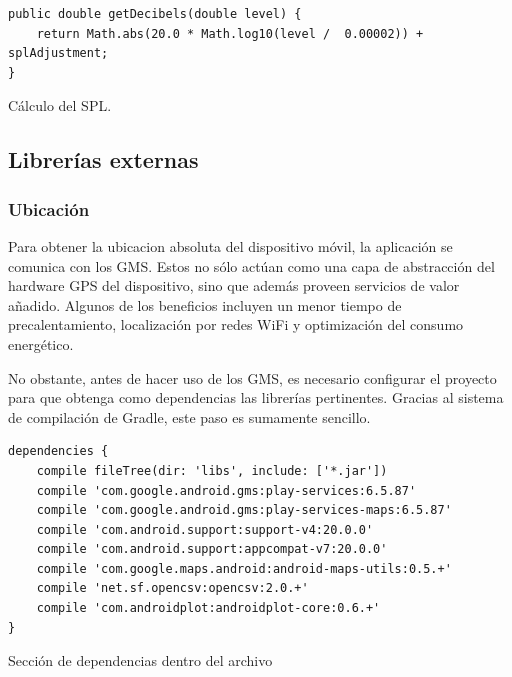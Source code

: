 \begin{listing}[h] 
\begin{verbatim}
public double getDecibels(double level) {
    return Math.abs(20.0 * Math.log10(level /  0.00002)) + splAdjustment;
}
\end{verbatim}
\caption{Cálculo del SPL.}
\label{code:spl}
\end{listing}

\subsection{Librerías externas}
\subsubsection{Ubicación}
\label{sec:libext}
\label{sec:impl:geo}
    Para obtener la ubicacion absoluta del dispositivo móvil, la aplicación se comunica con los \ac{GMS}. Estos no sólo actúan como una capa de abstracción del hardware GPS del dispositivo, sino que además proveen servicios de valor añadido. Algunos de los beneficios incluyen un menor tiempo de precalentamiento, localización por redes WiFi y optimización del consumo energético.

    No obstante, antes de hacer uso de los \ac{GMS}, es necesario configurar el proyecto para que obtenga como dependencias las librerías pertinentes. Gracias al sistema de compilación de Gradle, este paso es sumamente sencillo. 
\begin{listing}[h] 
\begin{verbatim}
dependencies {
    compile fileTree(dir: 'libs', include: ['*.jar'])
    compile 'com.google.android.gms:play-services:6.5.87'
    compile 'com.google.android.gms:play-services-maps:6.5.87'
    compile 'com.android.support:support-v4:20.0.0'
    compile 'com.android.support:appcompat-v7:20.0.0'
    compile 'com.google.maps.android:android-maps-utils:0.5.+'
    compile 'net.sf.opencsv:opencsv:2.0.+'
    compile 'com.androidplot:androidplot-core:0.6.+'
}
\end{verbatim}
\caption{Sección de dependencias dentro del archivo }
\label{code:buildeps}
\end{listing}


